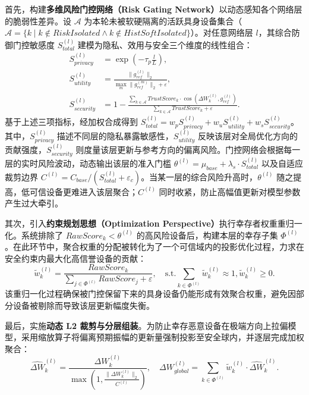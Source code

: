 \documentclass[11pt, a4paper, UTF8, fontset=fandol]{ctexart}
\begin{document}
首先，构建\textbf{多维风险门控网络（Risk Gating Network）}以动态感知各个网络层的脆弱性差异。设 $\mathcal{A}$ 为本轮未被软硬隔离的活跃具身设备集合（$\mathcal{A} = \{k \mid k \notin RiskIsolated \land k \notin HistSoftIsolated\}$）。对任意网络层 $l$，其综合防御门控敏感度 $S_{total}^{(l)}$ 建模为隐私、效用与安全三个维度的线性组合：
\begin{align}
    S_{privacy}^{(l)}  & = \exp\left(-\tau_{p} \frac{l}{L}\right),                                                                                                          \\
    S_{utility}^{(l)}  & = \frac{\|g_{ref}^{(l)}\|_{2}}{\max_{m}\|g_{ref}^{(m)}\|_{2} + \varepsilon},                                                                       \\
    S_{security}^{(l)} & = 1 - \frac{\sum_{k\in\mathcal{A}}TrustScore_{k}\cdot\cos(\Delta W_{k}^{(l)}, g_{ref}^{(l)})}{\sum_{k\in\mathcal{A}}TrustScore_{k} + \varepsilon}.
\end{align}
基于上述三项指标，经加权合成得到 $S_{total}^{(l)} = w_p S_{privacy}^{(l)} + w_u S_{utility}^{(l)} + w_s S_{security}^{(l)}$。其中，$S_{privacy}^{(l)}$ 描述不同层的隐私暴露敏感性，$S_{utility}^{(l)}$ 反映该层对全局优化方向的贡献强度，$S_{security}^{(l)}$ 则度量该层更新与参考方向的偏离风险。门控网络会根据每一层的实时风险波动，动态输出该层的准入门槛 $\theta^{(l)} = \mu_{base} + \lambda_s \cdot S_{total}^{(l)}$ 以及自适应裁剪边界 $C^{(l)} = C_{base} / (S_{total}^{(l)} + \varepsilon_c)$。当某一层的综合风险升高时，$\theta^{(l)}$ 随之提高，低可信设备更难进入该层聚合；$C^{(l)}$ 同时收紧，防止高幅值更新对模型参数产生过大牵引。

其次，引入\textbf{约束规划思想（Optimization Perspective）}执行幸存者权重重归一化。系统排除了 $RawScore_k < \theta^{(l)}$ 的高风险设备后，构建本层的幸存子集 $\Phi^{(l)}$。在此环节中，聚合权重的分配被转化为了一个可信域内的投影优化过程，力求在安全约束内最大化高信誉设备的贡献：
\begin{equation}
    \tilde{w}_{k}^{(l)} = \frac{RawScore_{k}}{\sum_{j\in\Phi^{(l)}}RawScore_{j} + \varepsilon}, \quad \text{s.t.} \sum_{k\in\Phi^{(l)}} \tilde{w}_{k}^{(l)} \approx 1, \tilde{w}_{k}^{(l)} \ge 0.
\end{equation}
该重归一化过程确保被门控保留下来的具身设备仍能形成有效聚合权重，避免因部分设备被剔除而导致该层更新幅度失衡。

最后，实施\textbf{动态 L2 裁剪与分层组装}。为防止幸存恶意设备在极端方向上拉偏模型，采用缩放算子将偏离预期振幅的更新量强制投影至安全球内，并逐层完成加权聚合：
\begin{equation}
    \widehat{\Delta W}_{k}^{(l)} = \frac{\Delta W_{k}^{(l)}}{\max\left(1, \frac{\|\Delta W_{k}^{(l)}\|_{2}}{C^{(l)}}\right)}, \quad \Delta W_{global}^{(l)} = \sum_{k\in\Phi^{(l)}}\tilde{w}_{k}^{(l)} \cdot \widehat{\Delta W}_{k}^{(l)}.
\end{equation}
\end{document}
